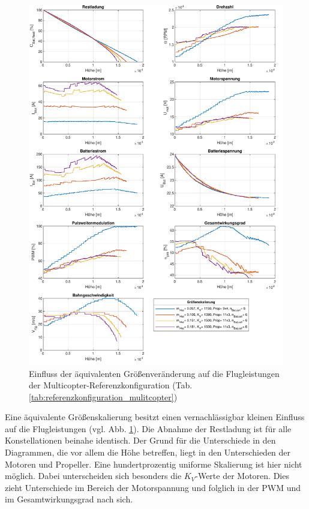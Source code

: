 \begin{figure}[H]
	\includegraphics[scale=0.7]{Diagramme/Groessenskalierung.pdf}
	\caption{Einfluss der äquivalenten Größenveränderung auf die Flugleistungen der Multicopter-Referenzkonfiguration (Tab. \ref{tab:referenzkonfiguration_mulitcopter})}
	\label{abb:groessenskalierung}
\end{figure}
Eine äquivalente Größenskalierung besitzt einen vernachlässigbar kleinen Einfluss auf die Flugleistungen (vgl. Abb. \ref{abb:groessenskalierung}). Die Abnahme der Restladung ist für alle Konstellationen beinahe identisch. Der Grund für die Unterschiede in den Diagrammen, die vor allem die Höhe betreffen, liegt in den Unterschieden der Motoren und Propeller. Eine hundertprozentig uniforme Skalierung ist hier nicht möglich. Dabei unterscheiden sich besonders die \ensuremath{K_V}-Werte der Motoren. Dies zieht Unterschiede im Bereich der Motorspannung und folglich in der PWM und im Gesamtwirkungsgrad nach sich. \\
